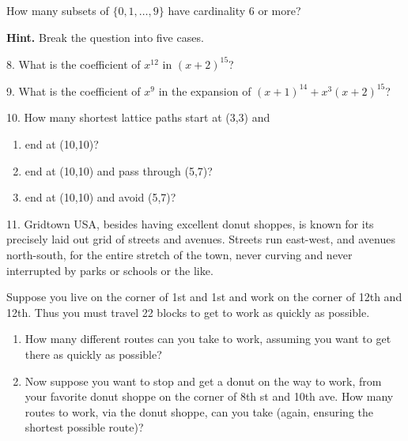 \documentclass[10pt,]{book}
\theoremstyle{plain}
\theoremstyle{definition}
\theoremstyle{definition}
\theoremstyle{definition}
\theoremstyle{definition}
\numberwithin{equation}{chapter}
\begin{document}
\begin{exerciselist}
How many subsets of \(\{0,1,\ldots, 9\}\) have cardinality 6 or more?%
\par\smallskip
\par\smallskip%
\noindent\textbf{Hint.}\hypertarget{hint-5}{}\quad%
\hypertarget{p-866}{}%
Break the question into five cases.%
\item[8.]\hypertarget{exercise-105}{}\hypertarget{p-867}{}%
What is the coefficient of \(x^{12}\) in \((x+2)^{15}\)?%
\par\smallskip
\item[9.]\hypertarget{exercise-106}{}\hypertarget{p-869}{}%
What is the coefficient of \(x^9\) in the expansion of \((x+1)^{14} + x^3(x+2)^{15}\)?%
\par\smallskip
\item[10.]\hypertarget{exercise-107}{}\hypertarget{p-870}{}%
How many shortest lattice paths start at (3,3) and \leavevmode%
\begin{enumerate}[label=(\alph*)]
\item\hypertarget{li-408}{}\hypertarget{p-871}{}%
end at (10,10)?%
\item\hypertarget{li-409}{}\hypertarget{p-872}{}%
end at (10,10) and pass through (5,7)?%
\item\hypertarget{li-410}{}\hypertarget{p-873}{}%
end at (10,10) and avoid (5,7)?%
\end{enumerate}
%
\par\smallskip
\item[11.]\hypertarget{exercise-108}{}\hypertarget{p-875}{}%
Gridtown USA, besides having excellent donut shoppes, is known for its precisely laid out grid of streets and avenues. Streets run east-west, and avenues north-south, for the entire stretch of the town, never curving and never interrupted by parks or schools or the like.%
\par
\hypertarget{p-876}{}%
Suppose you live on the corner of 1st and 1st and work on the corner of 12th and 12th. Thus you must travel 22 blocks to get to work as quickly as possible. \leavevmode%
\begin{enumerate}[label=(\alph*)]
\item\hypertarget{li-414}{}\hypertarget{p-877}{}%
How many different routes can you take to work, assuming you want to get there as quickly as possible? %
\item\hypertarget{li-415}{}\hypertarget{p-878}{}%
Now suppose you want to stop and get a donut on the way to work, from your favorite donut shoppe on the corner of 8th st and 10th ave. How many routes to work, via the donut shoppe, can you take (again, ensuring the shortest possible route)? %

\end{enumerate}
\end{exerciselist}
\end{document}
